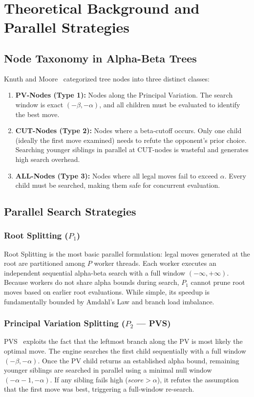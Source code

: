 \documentclass[11pt,a4paper]{article}
\begin{document}
\section{Theoretical Background and Parallel Strategies}
\label{sec:theory}

\subsection{Node Taxonomy in Alpha-Beta Trees}
Knuth and Moore~\cite{knuth1975analysis} categorized tree nodes into three distinct classes:
\begin{enumerate}
    \item \textbf{PV-Nodes (Type 1):} Nodes along the Principal Variation. The search window is exact $(-\beta, -\alpha)$, and all children must be evaluated to identify the best move.
    \item \textbf{CUT-Nodes (Type 2):} Nodes where a beta-cutoff occurs. Only one child (ideally the first move examined) needs to refute the opponent's prior choice. Searching younger siblings in parallel at CUT-nodes is wasteful and generates high search overhead.
    \item \textbf{ALL-Nodes (Type 3):} Nodes where all legal moves fail to exceed $\alpha$. Every child must be searched, making them safe for concurrent evaluation.
\end{enumerate}

\subsection{Parallel Search Strategies}

\subsubsection{Root Splitting ($P_1$)}
Root Splitting is the most basic parallel formulation: legal moves generated at the root are partitioned among $P$ worker threads. Each worker executes an independent sequential alpha-beta search with a full window $(-\infty, +\infty)$. Because workers do not share alpha bounds during search, $P_1$ cannot prune root moves based on earlier root evaluations. While simple, its speedup is fundamentally bounded by Amdahl's Law and branch load imbalance.

\subsubsection{Principal Variation Splitting ($P_2$ --- PVS)}
PVS~\cite{marsland1982parallel} exploits the fact that the leftmost branch along the PV is most likely the optimal move. The engine searches the first child sequentially with a full window $(-\beta, -\alpha)$. Once the PV child returns an established alpha bound, remaining younger siblings are searched in parallel using a minimal null window $(-\alpha-1, -\alpha)$. If any sibling fails high ($score > \alpha$), it refutes the assumption that the first move was best, triggering a full-window re-search.
\end{document}
